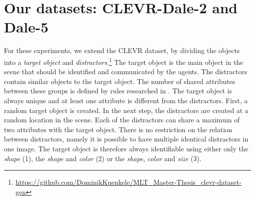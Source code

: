 \documentclass[11pt]{article}
\begin{document}

\section{Our datasets: CLEVR-Dale-2 and Dale-5}


For these experiments, we extend the CLEVR dataset, by dividing the objects into a \emph{target object} and \emph{distractors}.\footnote{\href{https://github.com/DominikKuenkele/MLT\_Master-Thesis\_clevr-dataset-gen}{https://github.com/DominikKuenkele/MLT\_Master-Thesis\_clevr-dataset-gen}}
The target object is the main object in the scene that should be identified and communicated by the agents.
The distractors contain similar objects to the target object.
The number of shared attributes between these groups is defined by rules researched in \citet{Dale1995}.
The target object is always unique and at least one attribute is different from the distractors.
First, a random target object is created.
In the next step, the distractors are created at a random location in the scene.
Each of the distractors can share a maximum of two attributes with the target object.
There is no restriction on the relation between distractors, namely it is possible to have multiple identical distractors in one image.
The target object is therefore always identifiable using either only the \emph{shape} (1), the \emph{shape} and \emph{color} (2) or the \emph{shape}, \emph{color} and \emph{size} (3).
\end{document}
